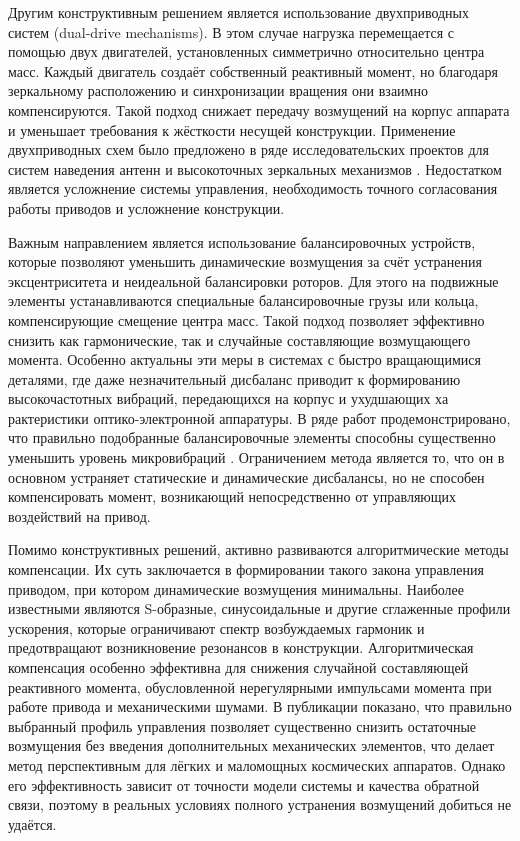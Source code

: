 Другим конструктивным решением является использование двухприводных систем (dual-drive mechanisms). В этом случае нагрузка перемещается с помощью двух двигателей, установленных симметрично относительно центра масс. Каждый двигатель создаёт собственный реактивный момент, но благодаря зеркальному расположению и синхронизации вращения они взаимно компенсируются. Такой подход снижает передачу возмущений на корпус аппарата и уменьшает требования к жёсткости несущей конструкции. Применение двухприводных схем было предложено в ряде исследовательских проектов для систем наведения антенн и высокоточных зеркальных механизмов \cite{worthington2010design}. Недостатком является усложнение системы управления, необходимость точного согласования работы приводов и усложнение конструкции.

Важным направлением является использование балансировочных устройств, которые позволяют уменьшить динамические возмущения за счёт устранения эксцентриситета и неидеальной балансировки роторов. Для этого на подвижные элементы устанавливаются специальные балансировочные грузы или кольца, компенсирующие смещение центра масс. Такой подход позволяет эффективно снизить как гармонические, так и случайные составляющие возмущающего момента. Особенно актуальны эти меры в системах с быстро вращающимися деталями, где даже незначительный дисбаланс приводит к формированию высокочастотных вибраций, передающихся на корпус и ухудшающих ха рактеристики оптико-электронной аппаратуры. В ряде работ продемонстрировано, что правильно подобранные балансировочные элементы способны существенно уменьшить уровень микровибраций \cite{liu2008reaction,alcorn2018fully}. Ограничением метода является то, что он в основном устраняет статические и динамические дисбалансы, но не способен компенсировать момент, возникающий непосредственно от управляющих воздействий на привод.

Помимо конструктивных решений, активно развиваются алгоритмические методы компенсации. Их суть заключается в формировании такого закона управления приводом, при котором динамические возмущения минимальны. Наиболее известными являются S-образные, синусоидальные и другие сглаженные профили ускорения, которые ограничивают спектр возбуждаемых гармоник и предотвращают возникновение резонансов в конструкции. Алгоритмическая компенсация особенно эффективна для снижения случайной составляющей реактивного момента, обусловленной нерегулярными импульсами момента при работе привода и механическими шумами. В публикации \cite{singer1990preshaping,singhose2009command} показано, что правильно выбранный профиль управления позволяет существенно снизить остаточные возмущения без введения дополнительных механических элементов, что делает метод перспективным для лёгких и маломощных космических аппаратов. Однако его эффективность зависит от точности модели системы и качества обратной связи, поэтому в реальных условиях полного устранения возмущений добиться не удаётся.

